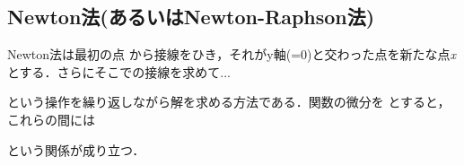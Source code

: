 \documentclass{article}
\begin{document}
\subsection{\textbf{Newton法(あるいはNewton-Raphson法)}}
\begin{maplegroup}
\begin{Maple Normal}{
Newton法は最初の点
から接線をひき，それがy軸(=0)と交わった点を新たな点\textit{x}
とする．さらにそこでの接線を求めて...}\end{Maple Normal}

\begin{Maple Normal}{
という操作を繰り返しながら解を求める方法である．関数の微分を
とすると，これらの間には}\end{Maple Normal}
\end{maplegroup}
\begin{maplelatex}\begin{Maple Normal}{
}\end{Maple Normal}
\end{maplelatex}
\begin{maplelatex}\begin{Maple Normal}{
}\end{Maple Normal}
\end{maplelatex}
\begin{maplelatex}\begin{Maple Normal}{
}\end{Maple Normal}
\end{maplelatex}
\begin{maplelatex}\begin{Maple Normal}{
}\end{Maple Normal}
\end{maplelatex}
\begin{maplegroup}
\begin{Maple Normal}{
という関係が成り立つ．}\end{Maple Normal}

\end{maplegroup}
\begin{maplegroup}
\begin{mapleinput}
\end{mapleinput}
\end{maplegroup}
\end{document}
